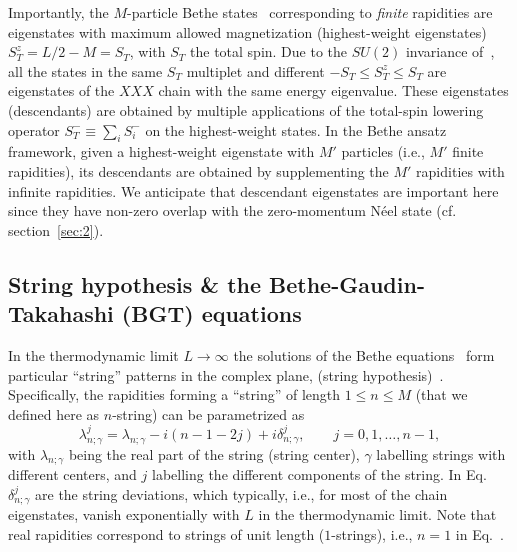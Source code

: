 \documentclass[11pt]{iopart}
\begin{document}
Importantly, the $M$-particle Bethe states~ corresponding to 
{\it finite} rapidities are eigenstates with maximum allowed magnetization 
(highest-weight eigenstates) $S_T^z=L/2-M=S_T$, with $S_T$ the total spin. 
Due to the $SU(2)$ invariance of~, all the states in the same 
$S_T$ multiplet and different $-S_T\le S_T^z\le S_T$ are eigenstates of the 
$XXX$ chain with the same energy eigenvalue. These eigenstates (descendants) 
are obtained by multiple applications of the total-spin lowering operator 
$S_T^-\equiv\sum_iS_i^-$ on the highest-weight states. In the Bethe ansatz 
framework, given a highest-weight eigenstate with $M'$ particles (i.e., $M'$ 
finite rapidities), its descendants are obtained by supplementing the $M'$ 
rapidities with infinite rapidities. We anticipate that descendant eigenstates 
are important here since they have non-zero overlap with the zero-momentum 
N\'eel state (cf. section~\ref{sec:2}). 
 
\subsection{String hypothesis \& the Bethe-Gaudin-Takahashi (BGT) equations}
\label{sec:1.3}

In the thermodynamic limit $L\to\infty$ the solutions of the Bethe 
equations~ form particular ``string'' patterns in the complex plane, 
(string hypothesis)~\cite{bethe-1931,taka-book}. Specifically, the rapidities 
forming a ``string'' of length $1\le n\le M$ (that we defined here as 
$n$-string) can be parametrized as 
%
\begin{equation}
\label{str-hyp}
\lambda^{j}_{n;\gamma}=\lambda_{n;\gamma}-i(n-1-2j)+i\delta_{n;\gamma}^j,\qquad 
j=0,1,\dots, n-1, 
\end{equation}
%
with $\lambda_{n;\gamma}$ being the real part of the string (string center), 
$\gamma$ labelling strings with different centers, and $j$ labelling the different 
components of the string. In Eq.~ $\delta_{n;\gamma}^j$ are the string 
deviations, which typically, i.e., for most of the chain eigenstates, vanish 
exponentially with $L$ in the thermodynamic limit. Note that real rapidities 
correspond to strings of unit length ($1$-strings), i.e., $n=1$ in Eq.~. 
\end{document}
